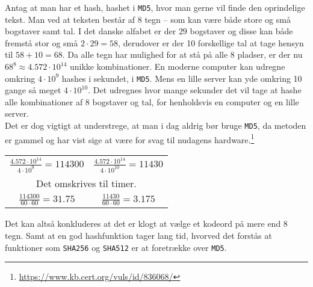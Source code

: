 \begin{eks}
    \label{brutefc}
    Antag at man har et hash, hashet i \texttt{MD5}, hvor man gerne vil finde den oprindelige tekst.
    Man ved at teksten består af 8 tegn -- som kan være både store og små bogstaver samt tal.
    I det danske alfabet er der \(29\) bogstaver og disse kan både fremstå stor og små \(2 \cdot 29 = 58\), derudover er der 10 forskellige tal at tage hensyn til \(58 + 10 = 68\).
    Da alle tegn har mulighed for at stå på alle 8 pladser, er der nu \(68^8\approx 4.572 \cdot 10^{14}\) unikke kombinationer.
    En moderne computer kan udregne omkring \(4 \cdot 10^9\) hashes i sekundet, i \texttt{MD5}.
    Mens en lille server kan yde omkring 10 gange så meget \(4 \cdot 10^{10}\).\cite{ytpwd}
    Det udregnes hvor mange sekunder det vil tage at hashe alle kombinationer af 8 bogstaver og tal, for henholdsvis en computer og en lille server.\\
    Det er dog vigtigt at understrege, at man i dag aldrig bør bruge \texttt{MD5}, da metoden er gammel og har vist sige at være for svag til nudagens hardware.\footnote{\url{https://www.kb.cert.org/vuls/id/836068/}}

    \setlength{\tabcolsep}{50pt} %
    \begin{center}
        \begin{tabular}{c c}

            \(\frac{4.572 \cdot 10^{14}}{4 \cdot 10^9} = 114300\) &
            \(\frac{4.572 \cdot 10^{14}}{4 \cdot 10^{10}} = 11430\)\\

            \multicolumn{2}{c}{Det omskrives til timer.}\\

            \(\frac{114300}{60 \cdot 60} = 31.75\) &
            \(\frac{11430}{60 \cdot 60} = 3.175\)\\

        \end{tabular}
    \end{center}

    \noindent
    Det kan altså konkluderes at det er klogt at vælge et kodeord på mere end 8 tegn.
    Samt at en god hashfunktion tager lang tid, hvorved det forstås at funktioner som \texttt{SHA256} og \texttt{SHA512} er at foretrække over \texttt{MD5}.
\end{eks}


